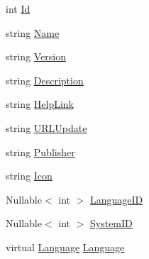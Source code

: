 \begin{DoxyCompactItemize}
\item 
int \hyperlink{class_smart__install_1_1_prog_aa2d0ae5b2e90aed283c33d2c31f2e0ea}{Id}
\item 
string \hyperlink{class_smart__install_1_1_prog_a27bb79e4d190a1233ea020dd5e42640b}{Name}
\item 
string \hyperlink{class_smart__install_1_1_prog_afe5824034eb128c9cbf4070662d9bfc5}{Version}
\item 
string \hyperlink{class_smart__install_1_1_prog_aca24c50cd14e1b94afe4e11ab6473374}{Description}
\item 
string \hyperlink{class_smart__install_1_1_prog_a01ce20f56b0c1d25333642c479fc0ca8}{Help\+Link}
\item 
string \hyperlink{class_smart__install_1_1_prog_adbdecfb233f4747de164aa713e0eb9b9}{U\+R\+L\+Update}
\item 
string \hyperlink{class_smart__install_1_1_prog_a7323e69631bf602cefbdb2e500553ec7}{Publisher}
\item 
string \hyperlink{class_smart__install_1_1_prog_a897d5c26dbfb350ef8c270f46275122e}{Icon}
\item 
Nullable$<$ int $>$ \hyperlink{class_smart__install_1_1_prog_a42c854c682c1c2856bb3212930126cb7}{Language\+I\+D}
\item 
Nullable$<$ int $>$ \hyperlink{class_smart__install_1_1_prog_abba886f20aedba13ab6739e4726eaf22}{System\+I\+D}
\item 
virtual \hyperlink{class_smart__install_1_1_language}{Language} \hyperlink{class_smart__install_1_1_prog_a74ca35d7e87453b35481b3709ac25605}{Language}

\end{DoxyCompactItemize}
